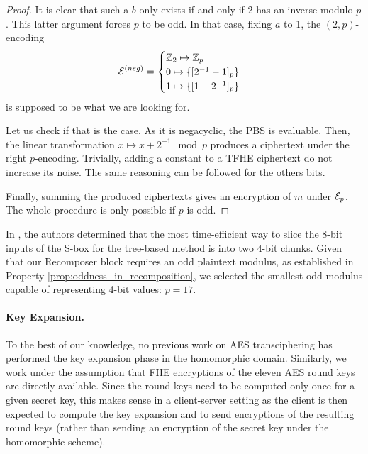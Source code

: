 \begin{proof}
It is clear that such a $b$ only exists if and only if 2 has an inverse modulo $p$. This latter argument forces $p$ to be odd. In that case, fixing $a$ to 1, the $(2, p)$-encoding 
$$
\mathcal{E}^{(neg)} = \begin{cases} \mathbb{Z}_2 \mapsto \mathbb{Z}_{p} \\ 0 \mapsto \{[2^{-1} - 1]_p\} \\ 1 \mapsto \{[1 - 2^{-1}]_p\} \end{cases}
$$ 
is supposed to be what we are looking for.

Let us check if that is the case. As it is negacyclic, the PBS is evaluable. Then, the linear transformation $x \mapsto x + 2^{-1} \mod p $ produces a ciphertext under the right $p$-encoding. Trivially, adding a constant to a TFHE ciphertext do not increase its noise. The same reasoning can be followed for the others bits.

Finally, summing the produced ciphertexts gives an encryption of $m$ under $\mathcal{E}_p$. The whole procedure is only possible if $p$ is odd.
\end{proof}


In \cite{DBLP:conf/wahc/TramaCBS23}, the authors determined that the most time-efficient way to slice the 8-bit inputs of the S-box for the tree-based method is into two 4-bit chunks. Given that our Recomposer block requires an odd plaintext modulus, as established in Property \ref{prop:oddness_in_recomposition}, we selected the smallest odd modulus capable of representing 4-bit values: $p=17$. 

\paragraph{Key Expansion.} 
To the best of our knowledge, no previous work on AES transciphering has performed the key expansion phase in the homomorphic domain. Similarly, we work under the assumption that FHE encryptions of the eleven AES round keys are directly available. Since the round keys need to be computed only once for a given secret key, this makes sense in a client-server setting as the client is then expected to compute the key expansion and to send encryptions of the resulting round keys (rather than sending an encryption of the secret key under the homomorphic scheme).



